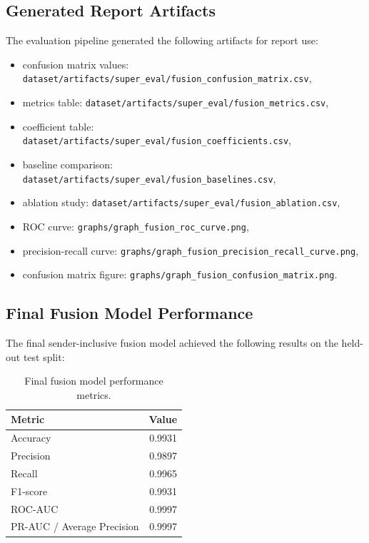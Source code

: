 \subsection{Generated Report Artifacts}
The evaluation pipeline generated the following artifacts for report use:
\begin{itemize}
  \item confusion matrix values: \texttt{dataset/artifacts/super\_eval/fusion\_confusion\_matrix.csv},
  \item metrics table: \texttt{dataset/artifacts/super\_eval/fusion\_metrics.csv},
  \item coefficient table: \texttt{dataset/artifacts/super\_eval/fusion\_coefficients.csv},
  \item baseline comparison: \texttt{dataset/artifacts/super\_eval/fusion\_baselines.csv},
  \item ablation study: \texttt{dataset/artifacts/super\_eval/fusion\_ablation.csv},
  \item ROC curve: \texttt{graphs/graph\_fusion\_roc\_curve.png},
  \item precision-recall curve: \texttt{graphs/graph\_fusion\_precision\_recall\_curve.png},
  \item confusion matrix figure: \texttt{graphs/graph\_fusion\_confusion\_matrix.png}.
\end{itemize}

\subsection{Final Fusion Model Performance}
The final sender-inclusive fusion model achieved the following results on the held-out test split:

\begin{table}[h]
\centering
\begin{tabular}{lr}
\hline
\textbf{Metric} & \textbf{Value} \\
\hline
Accuracy & 0.9931 \\
Precision & 0.9897 \\
Recall & 0.9965 \\
F1-score & 0.9931 \\
ROC-AUC & 0.9997 \\
PR-AUC / Average Precision & 0.9997 \\
\hline
\end{tabular}
\caption{Final fusion model performance metrics.}
\label{tab:fusion_metrics}
\end{table}

